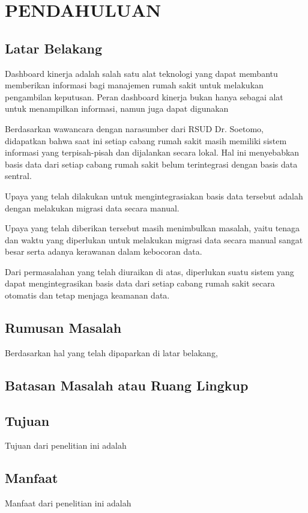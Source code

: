 \chapter{PENDAHULUAN}

\section{Latar Belakang}

Dashboard kinerja adalah salah satu alat teknologi yang dapat membantu memberikan informasi bagi manajemen rumah sakit untuk
melakukan pengambilan keputusan. Peran dashboard kinerja bukan hanya sebagai alat untuk menampilkan informasi, namun juga dapat
digunakan 

Berdasarkan wawancara dengan narasumber dari RSUD Dr. Soetomo, didapatkan bahwa saat ini setiap cabang rumah sakit masih memiliki 
sistem informasi yang terpisah-pisah dan dijalankan secara lokal. Hal ini menyebabkan basis data dari setiap cabang rumah sakit belum terintegrasi dengan basis data sentral. 


Upaya yang telah dilakukan untuk mengintegrasiakan basis data tersebut adalah dengan melakukan migrasi data secara manual.

Upaya yang telah diberikan tersebut masih menimbulkan masalah, yaitu tenaga dan waktu yang diperlukan untuk melakukan migrasi data secara manual sangat besar serta adanya kerawanan dalam kebocoran data.

Dari permasalahan yang telah diuraikan di atas, diperlukan suatu sistem yang dapat mengintegrasikan basis data dari setiap cabang rumah sakit secara otomatis dan tetap menjaga keamanan data.

\section{Rumusan Masalah}

Berdasarkan hal yang telah dipaparkan di latar belakang, \lipsum[4]

\section{Batasan Masalah atau Ruang Lingkup}

\lipsum[6]

\section{Tujuan}

Tujuan dari penelitian ini adalah \lipsum[7][1-14]

\section{Manfaat}

Manfaat dari penelitian ini adalah \lipsum[8][1-14]
